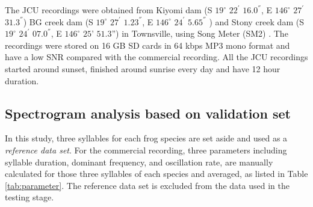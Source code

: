 The JCU recordings were obtained from Kiyomi dam (S $19^{\circ}$ $22^{'}$ $16.0^{''}$, E $146^{\circ}$ $27^{'}$ $31.3^{''}$)  BG creek dam (S $19^{\circ}$ $27^{'}$ $1.23^{''}$, E $146^{\circ}$ $24^{'}$ $5.65^{''}$ ) and Stony creek dam (S $19^{\circ}$ $24^{'}$ $07.0^{''}$, E $146^{\circ}$ $25’$ $51.3”$) in Townsville, using Song Meter (SM2) \citep{songMeter}. The recordings were stored on 16 GB SD cards in 64 kbps MP3 mono format and have a low SNR compared with the commercial recording. All the JCU recordings started around sunset, finished around sunrise every day and have 12 hour duration. 






\subsection{Spectrogram analysis based on validation set}
In this study, three syllables for each frog species are set aside and used as a \textit{reference data set}. For the commercial recording, three parameters including syllable duration, dominant frequency, and oscillation rate, are manually calculated for those three syllables of each species and averaged, as listed in Table \ref{tab:parameter}. The reference data set is excluded from the data used in the testing stage. 

